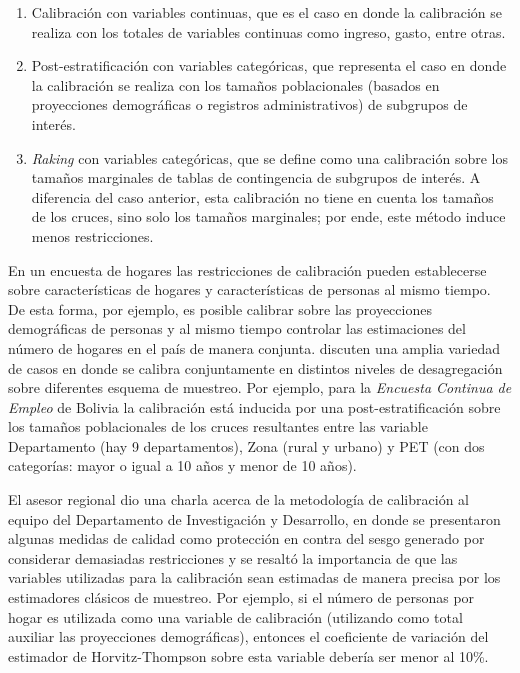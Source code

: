 \begin{enumerate}
\def\labelenumi{\arabic{enumi}.}
\tightlist
\item
  Calibración con variables continuas, que es el caso en donde la calibración se realiza con los totales de variables continuas como ingreso, gasto, entre otras.
\item
  Post-estratificación con variables categóricas, que representa el caso en donde la calibración se realiza con los tamaños poblacionales (basados en proyecciones demográficas o registros administrativos) de subgrupos de interés.
\item
  \emph{Raking} con variables categóricas, que se define como una calibración sobre los tamaños marginales de tablas de contingencia de subgrupos de interés. A diferencia del caso anterior, esta calibración no tiene en cuenta los tamaños de los cruces, sino solo los tamaños marginales; por ende, este método induce menos restricciones.
\end{enumerate}

En un encuesta de hogares las restricciones de calibración pueden establecerse sobre características de hogares y características de personas al mismo tiempo. De esta forma, por ejemplo, es posible calibrar sobre las proyecciones demográficas de personas y al mismo tiempo controlar las estimaciones del número de hogares en el país de manera conjunta. \citet{Estevao_Sarndal_2006} discuten una amplia variedad de casos en donde se calibra conjuntamente en distintos niveles de desagregación sobre diferentes esquema de muestreo. Por ejemplo, para la \emph{Encuesta Continua de Empleo} de Bolivia la calibración está inducida por una post-estratificación sobre los tamaños poblacionales de los cruces resultantes entre las variable Departamento (hay 9 departamentos), Zona (rural y urbano) y PET (con dos categorías: mayor o igual a 10 años y menor de 10 años).

El asesor regional dio una charla acerca de la metodología de calibración al equipo del Departamento de Investigación y Desarrollo, en donde se presentaron algunas medidas de calidad como protección en contra del sesgo generado por considerar demasiadas restricciones y se resaltó la importancia de que las variables utilizadas para la calibración sean estimadas de manera precisa por los estimadores clásicos de muestreo. Por ejemplo, si el número de personas por hogar es utilizada como una variable de calibración (utilizando como total auxiliar las proyecciones demográficas), entonces el coeficiente de variación del estimador de Horvitz-Thompson sobre esta variable debería ser menor al 10\%.

